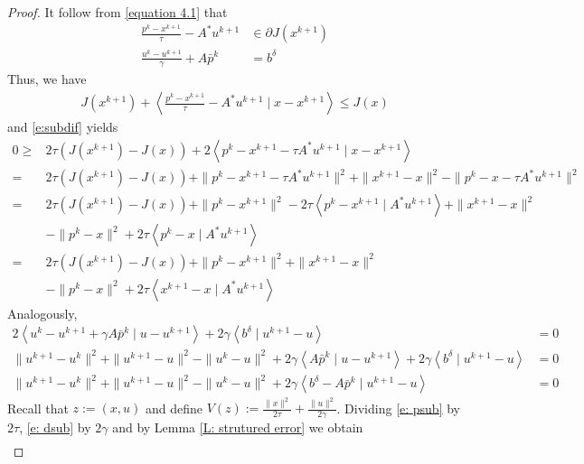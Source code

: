 \documentclass[11pt]{report}
\newcommand{\scal}[2]{{\left\langle{{#1}\mid{#2}}\right\rangle}}
\theoremstyle{plain}{\theorembodyfont{\rmfamily}%
\newtheorem{assumption}[theorem]{Assumption}}
\theoremstyle{plain}{\theorembodyfont{\rmfamily}%
\newtheorem{algorithm}[theorem]{Algorithm}}
\theoremstyle{plain}{\theorembodyfont{\rmfamily}%
\newtheorem{example}[theorem]{Example}}
\theoremstyle{plain}{\theorembodyfont{\rmfamily}%
\newtheorem{remark}[theorem]{Remark}}
\theoremstyle{plain}{\theorembodyfont{\rmfamily}%
\newtheorem{definition}[theorem]{Definition}}
\theoremstyle{plain}{\theorembodyfont{\rmfamily}%
\newtheorem{problem}[theorem]{Problem}}
\numberwithin{equation}{chapter}
\newcommand{\dal}{u}
\newcommand{\prim}{x}
\newcommand{\proj}{p}
\begin{document}
\begin{proof}
It follow from \eqref{equation 4.1} that
\begin{align}
    \frac{\proj^k-\prim^{k+1}}{\tau}- A^*\dal^{k+1}&\in\partial J(\prim^{k+1})\nonumber\\
   \frac{\dal^k-\dal^{k+1}}{\gamma}+A\bar{\proj}^k &=b^{\delta}
\end{align}
Thus, we have
\begin{align}
    J(\prim^{k+1})+\scal{\frac{\proj^k-\prim^{k+1}}{\tau}- A^*\dal^{k+1}}{\prim-\prim^{k+1}}\leq J(\prim)
    \label{e:subdif}
\end{align} and \eqref{e:subdif} yields
\begin{align}
         0\geq&2\tau \left(J(\prim^{k+1})-J(\prim)\right)+2\scal{\proj^k-\prim^{k+1}- \tau A^*\dal^{k+1}}{\prim-\prim^{k+1}}\nonumber\\ =& 2\tau \left(J(\prim^{k+1})-J(\prim)\right)+\|\proj^k-\prim^{k+1}-\tau A^*\dal^{k+1}\|^2+\|\prim^{k+1}-\prim\|^2-\|\proj^k-\prim-\tau A^*\dal^{k+1}\|^2
                  \nonumber\\= & 2\tau \left(J(\prim^{k+1})-J(\prim)\right)+\|\proj^k-\prim^{k+1}\|^2-2\tau\scal{\proj^k-\prim^{k+1}}{A^*\dal^{k+1}}+\|\prim^{k+1}-\prim\|^2&\nonumber\\&-\|\proj^k-\prim\|^2+2\tau\scal{\proj^k-\prim}{A^*\dal^{k+1}}  \nonumber\\ =&2\tau \left(J(\prim^{k+1})-J(\prim)\right)+\|\proj^k-\prim^{k+1}\|^2+\|\prim^{k+1}-\prim\|^2\nonumber\\&-\|\proj^k-\prim\|^2+2\tau\scal{\prim^{k+1}-\prim}{A^*\dal^{k+1}} 
                 \label{e: psub}
\end{align}
Analogously,
\begin{align}
    2\scal{\dal^k-\dal^{k+1}+\gamma A\bar{\proj}^k}{\dal-\dal^{k+1}}+2\gamma\scal{b^\delta}{\dal^{k+1}-\dal}&=0\nonumber\\ \|\dal^{k+1}-\dal^{k}\|^2+\|\dal^{k+1}-\dal\|^2-\|\dal^{k}-\dal\|^2+2\gamma\scal{ A\bar{\proj}^k}{\dal-\dal^{k+1}}+2\gamma\scal{b^\delta}{\dal^{k+1}-\dal}&=0\nonumber\\ \|\dal^{k+1}-\dal^{k}\|^2+\|\dal^{k+1}-\dal\|^2-\|\dal^{k}-\dal\|^2+2\gamma\scal{b^{\delta}-A\bar{\proj}^k}{\dal^{k+1}-\dal}&=0\label{e: dsub}
\end{align}
Recall that $z:=(\prim,\dal)$ and define  $V(z):=\frac{\|\prim\|^2}{2\tau}+\frac{\|\dal\|^2}{2\gamma}$. Dividing \eqref{e: psub} by $2\tau$, \eqref{e: dsub} by $2\gamma$ and by Lemma \ref{L: strutured error} we obtain 
\begin{align}

\end{align}
\end{proof}
\end{document}
